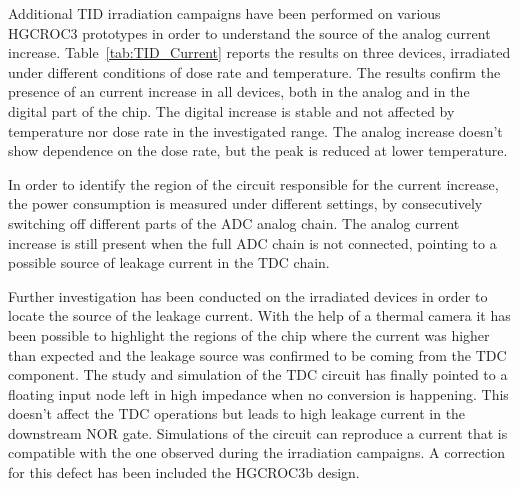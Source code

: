 \bigbreak

Additional TID irradiation campaigns have been performed on various HGCROC3 prototypes in order to understand the source of the analog current increase. 
Table~\ref{tab:TID_Current} reports the results on three devices, irradiated under different conditions of dose rate and temperature.
The results confirm the presence of an current increase in all devices, both in the analog and in the digital part of the chip. The digital increase is stable and not affected by temperature nor dose rate in the investigated range. The analog increase doesn't show dependence on the dose rate, but the peak is reduced at lower temperature.

In order to identify the region of the circuit responsible for the current increase, the power consumption is measured under different settings, by consecutively switching off different parts of the ADC analog chain. The analog current increase is still present when the full ADC chain is not connected, pointing to a possible source of leakage current in the TDC chain.

\bigbreak

Further investigation has been conducted on the irradiated devices in order to locate the source of the leakage current. With the help of a thermal camera it has been possible to highlight the regions of the chip where the current was higher than expected and the leakage source was confirmed to be coming from the TDC component.
The study and simulation of the TDC circuit has finally pointed to a floating input node left in high impedance when no conversion is happening.
This doesn't affect the TDC operations but leads to high leakage current in the downstream NOR gate. Simulations of the circuit can reproduce a current that is compatible with the one observed during the irradiation campaigns.
A correction for this defect has been included the HGCROC3b design.

